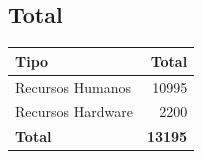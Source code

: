 		\subsection{Total}

			\begin{center}
				\begin{tabular}{| l | r |}
					\hline
					Tipo				&	Total			\\	\hline
					Recursos Humanos	& 	10995		\\	\hline
					Recursos Hardware	&	2200		\\	\hline
					\textbf{Total}		&	\textbf{13195}	\\
					\hline
				\end{tabular}
			\end{center}
